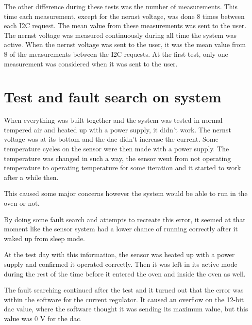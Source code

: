 The other difference during these tests was the number of measurements. This time each measurement, except for the nernst voltage, was done 8 times between each I2C request. The mean value from these measurements was sent to the user. The nernst voltage was measured continuously during all time the system was active. When the nernst voltage was sent to the user, it was the mean value from 8 of the measurements between the I2C requests. At the first test, only one measurement was considered when it was sent to the user.



\section{Test and fault search on system}


When everything was built together and the system was tested in normal tempered air and heated up with a power supply, it didn't work. The nernst voltage was at its bottom and the \ac{dac} didn't increase the current. Some temperature cycles on the sensor were then made with a power supply. The temperature was changed in such a way, the sensor went from not operating temperature to operating temperature for some iteration and it started to work after a while then.


This caused some major concerns however the system would be able to run in the oven or not. 

By doing some fault search and attempts to recreate this error, it seemed at that moment like the sensor system had a lower chance of running correctly after it waked up from sleep mode. 

At the test day with this information, the sensor was heated up with a power supply and confirmed it operated correctly. Then it was left in its active mode during the rest of the time before it entered the oven and inside the oven as well.


The fault searching continued after the test and it turned out that the error was within the software for the current regulator. It caused an overflow on the 12-bit \ac{dac} value, where the software thought it was sending its maximum value, but this value was 0 V for the \ac{dac}.




